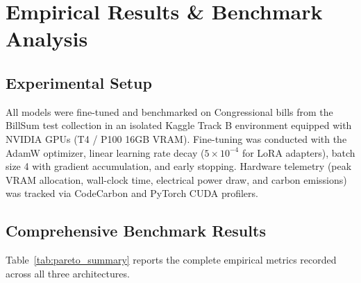 \documentclass[conference]{IEEEtran}
\begin{document}
\section{Empirical Results \& Benchmark Analysis}
\label{sec:results}

\subsection{Experimental Setup}
All models were fine-tuned and benchmarked on Congressional bills from the BillSum test collection in an isolated Kaggle Track B environment equipped with NVIDIA GPUs (T4 / P100 16GB VRAM). Fine-tuning was conducted with the AdamW optimizer, linear learning rate decay ($5 \times 10^{-4}$ for LoRA adapters), batch size 4 with gradient accumulation, and early stopping. Hardware telemetry (peak VRAM allocation, wall-clock time, electrical power draw, and carbon emissions) was tracked via CodeCarbon and PyTorch CUDA profilers.

\subsection{Comprehensive Benchmark Results}
Table~\ref{tab:pareto_summary} reports the complete empirical metrics recorded across all three architectures.
\end{document}
